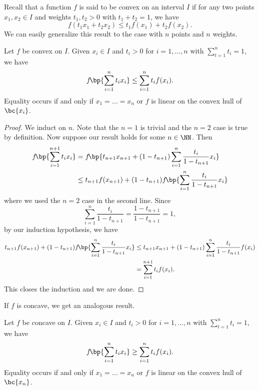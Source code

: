 Recall that a function $f$ is said to be convex on an interval $I$ if for any two points $x_1, x_2 \in I$ and weights $t_1, t_2 > 0$ with $t_1 + t_2 = 1$, we have \[f(t_1 x_1 + t_2 x_2) \leq t_1 f(x_1) + t_2 f(x_2).\] We can easily generalize this result to the case with $n$ points and $n$ weights.

\begin{theorem}
    Let $f$ be convex on $I$. Given $x_i \in I$ and $t_i > 0$ for $i = 1, \dots, n$ with $\sum_{t = 1}^n t_i = 1$, we have \[f\!\bp{\sum_{i = 1}^n t_i x_i} \leq \sum_{i = 1}^n t_i f(x_i).\] Equality occurs if and only if $x_1 = \dots = x_n$ or $f$ is linear on the convex hull of $\bc{x_i}$.
\end{theorem}
\begin{proof}
    We induct on $n$. Note that the $n = 1$ is trivial and the $n = 2$ case is true by definition. Now suppose our result holds for some $n \in \NN$. Then
    \begin{align*}
        f\!\bp{\sum_{i = 1}^{n+1} t_i x_i} &= f\!\bp{t_{n+1}x_{n+1} + (1-t_{n+1}) \sum_{i = 1}^n \frac{t_i}{1 - t_{n+1}} x_i}\\
        &\leq t_{n+1} f(x_{n+1}) + (1-t_{n+1}) f\!\bp{\sum_{i = 1}^n \frac{t_i}{1 - t_{n+1}} x_i}
    \end{align*}
    where we used the $n = 2$ case in the second line. Since \[\sum_{i = 1}^n \frac{t_i}{1 - t_{n+1}} = \frac{1 - t_{n+1}}{1 - t_{n+1}} = 1,\] by our induction hypothesis, we have
    \begin{align*}
        t_{n+1} f(x_{n+1}) + (1-t_{n+1}) f\!\bp{\sum_{i = 1}^n \frac{t_i}{1 - t_{n+1}} x_i} &\leq t_{n+1} x_{n+1} + (1-t_{n+1}) \sum_{i = 1}^n \frac{t_i}{1 - t_{n+1}} f(x_i)\\
        &= \sum_{i = 1}^{n+1} t_i f(x_i).
    \end{align*}
    This closes the induction and we are done.
\end{proof}

If $f$ is concave, we get an analogous result.

\begin{theorem}
    Let $f$ be concave on $I$. Given $x_i \in I$ and $t_i > 0$ for $i = 1, \dots, n$ with $\sum_{t = 1}^n t_i = 1$, we have \[f\!\bp{\sum_{i = 1}^n t_i x_i} \geq \sum_{i = 1}^n t_i f(x_i).\] Equality occurs if and only if $x_1 = \dots = x_n$ or $f$ is linear on the convex hull of $\bc{x_n}$.
\end{theorem}

